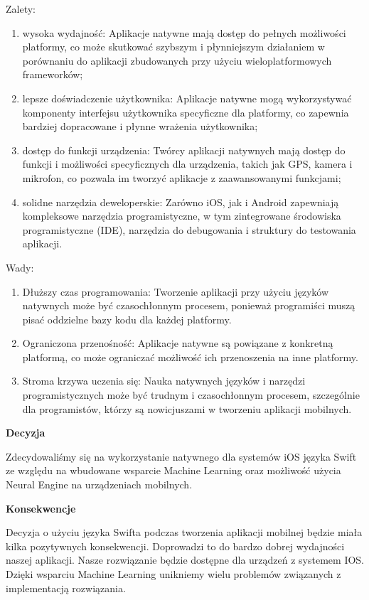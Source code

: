 \documentclass[12pt, a4paper, twoside, openany]{book}
\begin{document}
Zalety:
\begin{enumerate}[label=--]
    \item wysoka wydajność: Aplikacje natywne mają dostęp do pełnych możliwości platformy, co może skutkować szybszym i płynniejszym działaniem w porównaniu do aplikacji zbudowanych przy użyciu wieloplatformowych frameworków;
    \item lepsze doświadczenie użytkownika: Aplikacje natywne mogą wykorzystywać komponenty interfejsu użytkownika specyficzne dla platformy, co zapewnia bardziej dopracowane i płynne wrażenia użytkownika;
    \item dostęp do funkcji urządzenia: Twórcy aplikacji natywnych mają dostęp do funkcji i możliwości specyficznych dla urządzenia, takich jak GPS, kamera i mikrofon, co pozwala im tworzyć aplikacje z zaawansowanymi funkcjami;
    \item solidne narzędzia deweloperskie: Zarówno iOS, jak i Android zapewniają kompleksowe narzędzia programistyczne, w tym zintegrowane środowiska programistyczne (IDE), narzędzia do debugowania i struktury do testowania aplikacji.
\end{enumerate}

Wady:
\begin{enumerate}[label=--]
    \item Dłuższy czas programowania: Tworzenie aplikacji przy użyciu języków natywnych może być czasochłonnym procesem, ponieważ programiści muszą pisać oddzielne bazy kodu dla każdej platformy.
    \item Ograniczona przenośność: Aplikacje natywne są powiązane z konkretną platformą, co może ograniczać możliwość ich przenoszenia na inne platformy.
    \item Stroma krzywa uczenia się: Nauka natywnych języków i narzędzi programistycznych może być trudnym i czasochłonnym procesem, szczególnie dla programistów, którzy są nowicjuszami w tworzeniu aplikacji mobilnych.
\end{enumerate}

\textbf{Decyzja\\}

Zdecydowaliśmy się na wykorzystanie natywnego dla systemów iOS języka Swift ze względu na wbudowane wsparcie Machine Learning oraz możliwość użycia Neural Engine na urządzeniach mobilnych.

\textbf{Konsekwencje\\}

Decyzja o użyciu języka Swifta podczas tworzenia aplikacji mobilnej będzie miała kilka pozytywnych konsekwencji. Doprowadzi to do bardzo dobrej wydajności naszej aplikacji. Nasze rozwiązanie będzie dostępne dla urządzeń z systemem IOS. Dzięki wsparciu Machine Learning unikniemy wielu problemów związanych z implementacją rozwiązania.
\end{document}
